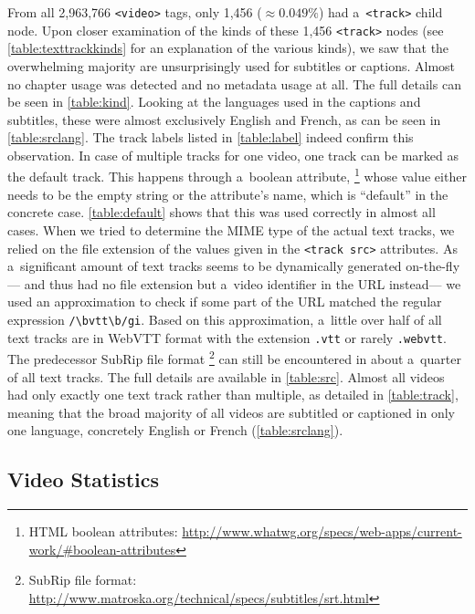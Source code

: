 \documentclass{sig-alternate}
\newcommand{\inlinelistingsize}{\fontsize{8pt}{11pt}}
\let\oldurl\url
\renewcommand{\url}[1]{\inlinelistingsize\oldurl{#1}}
\begin{document}
From all 2,963,766 \texttt{<video>} tags,
only 1,456 (${\approx0.049\%}$) had a~\texttt{<track>} child node.
Upon closer examination of the kinds of these 1,456 \texttt{<track>} nodes
(see \autoref{table:texttrackkinds} for an explanation of the various kinds),
we saw that the overwhelming majority are unsurprisingly
used for subtitles or captions.
Almost no chapter usage was detected
and no metadata usage at all.
The full details can be seen in \autoref{table:kind}.
Looking at the languages used in the captions and subtitles, 
these were almost exclusively English and French,
as can be seen in \autoref{table:srclang}.
The track labels listed in \autoref{table:label}
indeed confirm this observation.
In case of multiple tracks for one video,
one track can be marked as the default track.
This happens through a~boolean attribute,%
\footnote{HTML boolean attributes:
\url{http://www.whatwg.org/specs/web-apps/current-work/\#boolean-attributes}}
whose value either needs to be the empty string
or the attribute's name,
which is ``default'' in the concrete case.
\autoref{table:default}
shows that this was used correctly in almost all cases.
When we tried to determine the MIME type of the actual
text tracks, we relied on the file extension
of the values given in the \texttt{<track src>} attributes.
As a~significant amount of text tracks
seems to be dynamically generated on-the-fly---%
and thus had no file extension but a~video identifier in the URL instead---%
we used an approximation to check if some part
of the URL matched the regular expression \texttt{/\textbackslash bvtt\textbackslash b/gi}.
Based on this approximation,
a~little over half of all text tracks
are in WebVTT format
with the extension \texttt{.vtt}
or rarely \texttt{.webvtt}.
The predecessor SubRip file format%
\footnote{SubRip file format:
\url{http://www.matroska.org/technical/specs/subtitles/srt.html}}
can still be encountered in about
a~quarter of all text tracks.
The full details are available in \autoref{table:src}.
Almost all videos had only exactly one text track
rather than multiple, as detailed in \autoref{table:track},
meaning that the broad majority of all videos are subtitled or captioned
in only one language, concretely English or French (\autoref{table:srclang}).

\subsection{Video Statistics}
\end{document}
